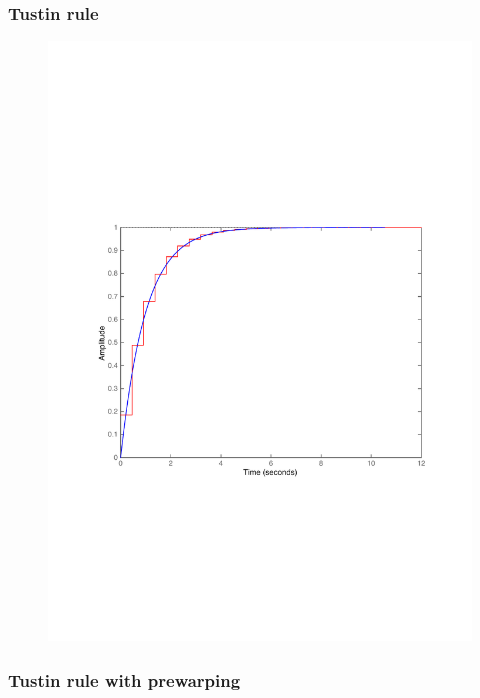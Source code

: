 \begin{frame}
	\frametitle{Tustin rule}
	\vspace{-0.7em}
	\begin{figure}
		\centering
		\includegraphics[width=0.85\linewidth]{vb5}
	\end{figure}
\end{frame}

\begin{frame}
	\frametitle{Tustin rule with prewarping}
\end{frame}